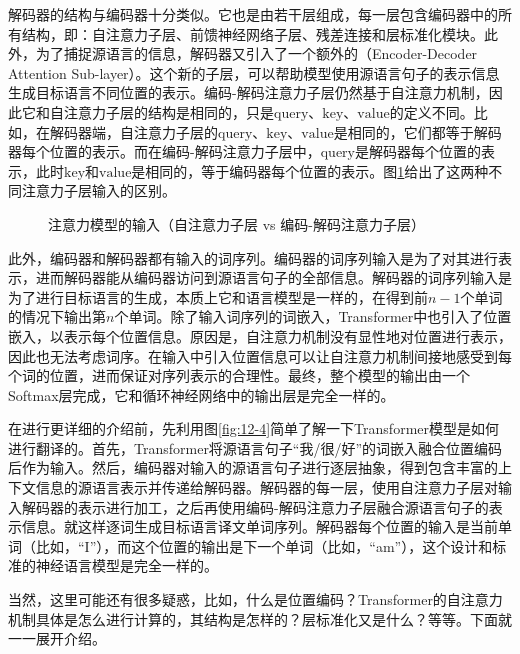 \parinterval 解码器的结构与编码器十分类似。它也是由若干层组成，每一层包含编码器中的所有结构，即：自注意力子层、前馈神经网络子层、残差连接和层标准化模块。此外，为了捕捉源语言的信息，解码器又引入了一个额外的{\small{}}（Encoder-Decoder Attention Sub-layer）。这个新的子层，可以帮助模型使用源语言句子的表示信息生成目标语言不同位置的表示。编码-解码注意力子层仍然基于自注意力机制，因此它和自注意力子层的结构是相同的，只是$\mathrm{query}$、$\mathrm{key}$、$\mathrm{value}$的定义不同。比如，在解码器端，自注意力子层的$\mathrm{query}$、$\mathrm{key}$、$\mathrm{value}$是相同的，它们都等于解码器每个位置的表示。而在编码-解码注意力子层中，$\mathrm{query}$是解码器每个位置的表示，此时$\mathrm{key}$和$\mathrm{value}$是相同的，等于编码器每个位置的表示。图\ref{fig:12-5}给出了这两种不同注意力子层输入的区别。

\begin{figure}[htp]
    \centering
   
    \caption{ 注意力模型的输入（自注意力子层 vs 编码-解码注意力子层）}
    \label{fig:12-5}
\end{figure}

\parinterval 此外，编码器和解码器都有输入的词序列。编码器的词序列输入是为了对其进行表示，进而解码器能从编码器访问到源语言句子的全部信息。解码器的词序列输入是为了进行目标语言的生成，本质上它和语言模型是一样的，在得到前$n-1$个单词的情况下输出第$n$个单词。除了输入词序列的词嵌入，Transformer中也引入了位置嵌入，以表示每个位置信息。原因是，自注意力机制没有显性地对位置进行表示，因此也无法考虑词序。在输入中引入位置信息可以让自注意力机制间接地感受到每个词的位置，进而保证对序列表示的合理性。最终，整个模型的输出由一个Softmax层完成，它和循环神经网络中的输出层是完全一样的。

\parinterval 在进行更详细的介绍前，先利用图\ref{fig:12-4}简单了解一下Transformer模型是如何进行翻译的。首先，Transformer将源语言句子“我/很/好”的词嵌入融合位置编码后作为输入。然后，编码器对输入的源语言句子进行逐层抽象，得到包含丰富的上下文信息的源语言表示并传递给解码器。解码器的每一层，使用自注意力子层对输入解码器的表示进行加工，之后再使用编码-解码注意力子层融合源语言句子的表示信息。就这样逐词生成目标语言译文单词序列。解码器每个位置的输入是当前单词（比如，“I”），而这个位置的输出是下一个单词（比如，“am”），这个设计和标准的神经语言模型是完全一样的。

\parinterval 当然，这里可能还有很多疑惑，比如，什么是位置编码？Transformer的自注意力机制具体是怎么进行计算的，其结构是怎样的？层标准化又是什么？等等。下面就一一展开介绍。

